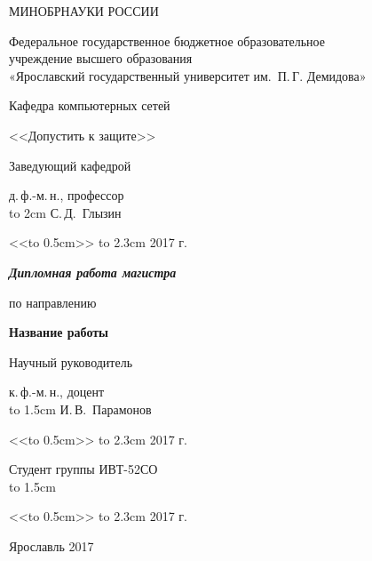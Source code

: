 \thispagestyle{empty}

\enlargethispage{2cm}
{
\renewcommand{\baselinestretch}{1.25}
\selectfont

\begin{center}
МИНОБРНАУКИ РОССИИ

Федеральное государственное бюджетное образовательное\\ учреждение
высшего образования\\
«Ярославский государственный университет им.~П.\,Г. Демидова»

Кафедра компьютерных сетей

\vspace{1.5cm}

\hfill\parbox{6.5cm}
{ 
<<Допустить к защите>>

Заведующий кафедрой

д.\,ф.-м.\,н., профессор \\
\hbox to 2cm{\hrulefill} С.\,Д.~Глызин

<<\hbox to 0.5cm{\hrulefill}>> \hbox to 2.3cm{\hrulefill} 2017 г.
}

\vspace{1.5cm}

{\bf \em Дипломная работа магистра}
\par по направлению 



\vspace{0.5cm}

{ \large \bf \selectfont Название работы
  
}

\vspace{3cm}


\hfill\parbox{6.5cm}
{ 
Научный руководитель

к.\,ф.-м.\,н., доцент\\
\hbox to 1.5cm{\hrulefill} И.\,В.~Парамонов

<<\hbox to 0.5cm{\hrulefill}>> \hbox to 2.3cm{\hrulefill} 2017 г.
}

\vspace{1.5cm}

\hfill\parbox{6.5cm}
{ 
Студент группы ИВТ-52СО\\
\hbox to 1.5cm{\hrulefill}

<<\hbox to 0.5cm{\hrulefill}>> \hbox to 2.3cm{\hrulefill} 2017 г.
}

\vspace{2cm}

Ярославль 2017
 
\end{center}
}

\newpage

